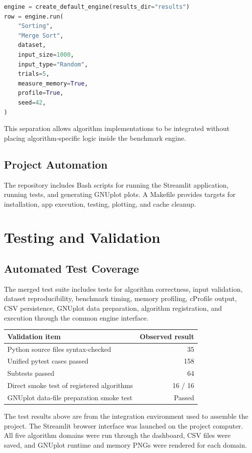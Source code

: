\documentclass[11pt,a4paper]{report}
\begin{document}
\begin{lstlisting}[language=Python]
engine = create_default_engine(results_dir="results")
row = engine.run(
    "Sorting",
    "Merge Sort",
    dataset,
    input_size=1000,
    input_type="Random",
    trials=5,
    measure_memory=True,
    profile=True,
    seed=42,
)
\end{lstlisting}

This separation allows algorithm implementations to be integrated without
placing algorithm-specific logic inside the benchmark engine.

\section{Project Automation}
The repository includes Bash scripts for running the Streamlit application,
running tests, and generating GNUplot plots. A Makefile provides targets for
installation, app execution, testing, plotting, and cache cleanup.

\chapter{Testing and Validation}

\section{Automated Test Coverage}
The merged test suite includes tests for algorithm correctness, input
validation, dataset reproducibility, benchmark timing, memory profiling,
cProfile output, CSV persistence, GNUplot data preparation, algorithm
registration, and execution through the common engine interface.

\begin{center}
\begin{tabular}{lr}
\toprule
\textbf{Validation item} & \textbf{Observed result}\\
\midrule
Python source files syntax-checked & 35\\
Unified pytest cases passed & 158\\
Subtests passed & 64\\
Direct smoke test of registered algorithms & 16 / 16\\
GNUplot data-file preparation smoke test & Passed\\
\bottomrule
\end{tabular}
\end{center}

The test results above are from the integration environment used to assemble
the project. The Streamlit browser interface was launched on the project computer. All
five algorithm domains were run through the dashboard, CSV files were saved,
and GNUplot runtime and memory PNGs were rendered for each domain.
\end{document}
